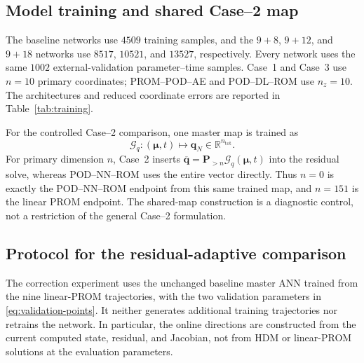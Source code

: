 \documentclass[11pt]{article}
\newcommand{\q}{\mathbf q}
\newcommand{\qbar}{\overline{\mathbf q}}
\newcommand{\qs}{\qbar}
\newcommand{\mub}{\bm\mu}
\begin{document}
\subsection{Model training and shared Case--2 map}
The baseline networks use $4509$ training samples, and the $9+8$, $9+12$,
and $9+18$ networks use $8517$, $10521$, and $13527$, respectively.  Every
network uses the same
$1002$ external-validation parameter--time samples.  Case~1 and Case~3 use
$n=10$ primary coordinates;
PROM--POD--AE and POD--DL--ROM use $n_z=10$.  The architectures and reduced
coordinate errors are reported in Table~\ref{tab:training}.
\begin{table}[H]
\centering
\caption{Training and held-out parameter-validation errors in reduced
coordinates.  The master map is shared between the Case--2 tail and the
POD--NN--ROM direct endpoint.}
\label{tab:training}
\resizebox{\textwidth}{!}{}
\end{table}

For the controlled Case--2 comparison, one master map is trained as
\begin{equation}
\mathcal G_q:(\mub,t)\longmapsto\widehat{\q}_N\in\mathbb R^{n_{\mathrm{tot}}}.
\label{eq:master-map}
\end{equation}
For primary dimension $n$, Case~2 inserts
$\qs=\mathbf P_{>n}\mathcal G_q(\mub,t)$ into the residual solve, whereas
POD--NN--ROM uses the entire vector directly.  Thus $n=0$ is exactly the
POD--NN--ROM endpoint from this same trained map, and $n=151$ is the linear
PROM endpoint.  The shared-map construction is a diagnostic control, not a
restriction of the general Case--2 formulation.

\subsection{Protocol for the residual-adaptive comparison}
\label{sec:adaptive-protocol}
The correction experiment uses the unchanged baseline master ANN trained
from the nine linear-PROM trajectories, with the two validation parameters
in \eqref{eq:validation-points}.  It neither generates additional training
trajectories nor retrains the network.  In particular, the online directions
are constructed from the current computed state, residual, and Jacobian,
not from HDM or linear-PROM solutions at the evaluation parameters.
\end{document}
